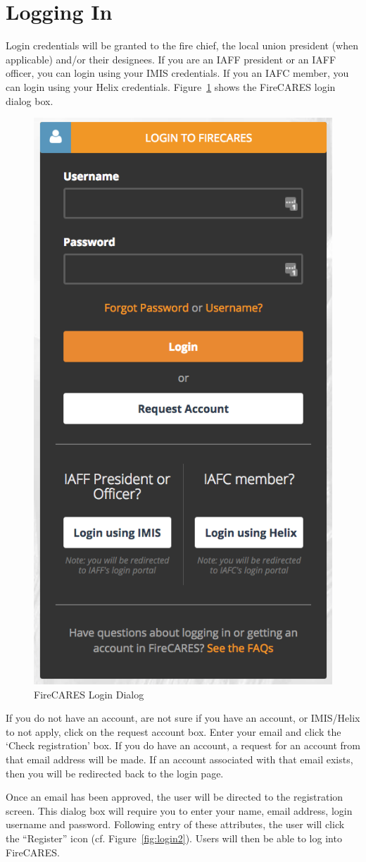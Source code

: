 \documentclass[12pt,oneside]{book}
\begin{document}
\section{Logging In}

Login credentials will be granted to the fire chief, the local union president (when applicable) and/or their designees. If you are an IAFF president or an IAFF officer, you can login using your IMIS credentials. If you an IAFC member, you can login using your Helix credentials. Figure~\ref{fig:login} shows the FireCARES login dialog box.

\begin{figure}[ht!]
\centering
\includegraphics[width=.5\columnwidth]{Figures/login}
\caption{FireCARES Login Dialog}
\label{fig:login}
\end{figure}

If you do not have an account, are not sure if you have an account, or IMIS/Helix to not apply, click on the request account box. Enter your email and click the `Check registration' box. If you do have an account, a request for an account from that email address will be made. If an account associated with that email exists, then you will be redirected back to the login page. 

\FloatBarrier

Once an email has been approved, the user will be directed to the registration screen. This dialog box will require you to enter your name, email address, login username and password.  Following entry of these attributes, the user will click the ``Register'' icon (cf. Figure~\ref{fig:login2}). Users will then be able to log into FireCARES.
\end{document}
